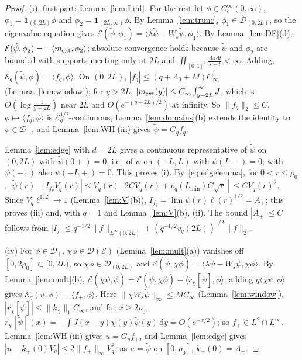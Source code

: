 \documentclass[11pt]{amsart}
\newcommand{\cE}{\mathcal{E}}
\newcommand{\one}{\mathbf{1}}
\newcommand{\dd}{\,\mathrm{d}}
\theoremstyle{definition}
\theoremstyle{remark}
\numberwithin{equation}{section}
\begin{document}
\begin{proof}
(i), first part: Lemma~\ref{lem:Linf}. For the rest let $\phi\in C_c^\infty(0,\infty)$, $\phi_1=\one_{(0,2L)}\phi$ and $\phi_2=\one_{(2L,\infty)}\phi$. By Lemma~\ref{lem:trunc}, $\phi_1\in \mathcal D_{(0,2L)}$, so the eigenvalue equation gives $\cE(\tilde\psi,\phi_1)=\langle\lambda\tilde\psi-W_s\tilde\psi,\phi_1\rangle$. By Lemma~\ref{lem:DF}(d), $\cE(\tilde\psi,\phi_2)=-\langle m_{\rm ext},\phi_2\rangle$; absolute convergence holds because $\tilde\psi$ and $\phi_2$ are bounded with supports meeting only at $2L$ and $\iint_{[0,1]^2}\frac{\dd s\dd t}{s+t}<\infty$. Adding, $\cE_q(\tilde\psi,\phi)=\langle f_q,\phi\rangle$. On $(0,2L)$, $|f_q|\le(q+\Lambda_0+M)C_\infty$ (Lemma~\ref{lem:window}); for $y>2L$, $|m_{\rm ext}(y)|\le C_\infty\int_{y-2L}^\infty J$, which is $O(\log\frac1{y-2L})$ near $2L$ and $O(e^{-(y-2L)/2})$ at infinity. So $\|f_q\|_2\le C$, $\phi\mapsto\langle f_q,\phi\rangle$ is $\cE_q^{1/2}$-continuous, Lemma~\ref{lem:domains}(b) extends the identity to $\phi\in \mathcal D_+$, and Lemma~\ref{lem:WH}(iii) gives $\tilde\psi=G_qf_q$.

Lemma~\ref{lem:edge} with $d=2L$ gives a continuous representative of $\tilde\psi$ on $(0,2L)$ with $\tilde\psi(0+)=0$, i.e.\ of $\psi$ on $(-L,L)$ with $\psi(L-)=0$; with $\psi(-\cdot)$ also $\psi(-L+)=0$. This proves (i). By~\eqref{eq:edgelemma}, for $0<r\le\rho_0$, $|\tilde\psi(r)-I_{f_q}V_q(r)|\le V_q(r)[2CV_q(r)+v_q(L_{\min})C\sqrt r]\le CV_q(r)^2$. Since $V_q\ell^{1/2}\to1$ (Lemma~\ref{lem:V}(b)), $I_{f_q}=\lim\tilde\psi(r)\ell(r)^{1/2}=A_+$; this proves (iii) and, with $q=1$ and Lemma~\ref{lem:V}(b), (ii). The bound $|A_+|\le C$ follows from $|I_f|\le q^{-1/2}\|f\|_{L^\infty(0,2L)}+(q^{-1/2}v_q(2L))^{1/2}\|f\|_2$.

(iv) For $\phi\in \mathcal D_+$, $\chi\phi\in \mathcal D(\cE)$ (Lemma~\ref{lem:mult}(a)) vanishes off $[0,2\rho_0]\subset[0,2L)$, so $\chi\phi\in \mathcal D_{(0,2L)}$ and $\cE(\tilde\psi,\chi\phi)=\langle\lambda\tilde\psi-W_s\tilde\psi,\chi\phi\rangle$. By Lemma~\ref{lem:mult}(b), $\cE(\chi\tilde\psi,\phi)=\cE(\tilde\psi,\chi\phi)+\langle r_\chi[\tilde\psi],\phi\rangle$; adding $q\langle\chi\tilde\psi,\phi\rangle$ gives $\cE_q(u,\phi)=\langle f_+,\phi\rangle$. Here $\|\chi W_s\tilde\psi\|_\infty\le MC_\infty$ (Lemma~\ref{lem:window}), $|r_\chi[\tilde\psi]|\le\|k_\chi\|_1C_\infty$, and for $x\ge2\rho_0$, $r_\chi[\tilde\psi](x)=-\int J(x-y)\chi(y)\tilde\psi(y)\dd y=O(e^{-x/2})$; so $f_+\in L^2\cap L^\infty$. Lemma~\ref{lem:WH}(iii) gives $u=G_qf_+$, and Lemma~\ref{lem:edge} gives $|u-k_+(0)V_q|\le2\|f_+\|_\infty V_q^2$; as $u=\tilde\psi$ on $[0,\rho_0]$, $k_+(0)=A_+$.
\end{proof}
\end{document}
